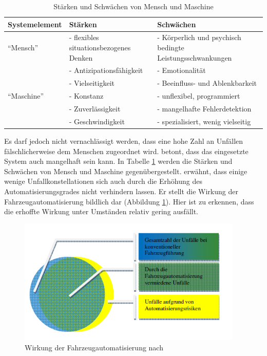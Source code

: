 \begin{table}[htpb]
	\scriptsize
	\caption[Stärken und Schwächen von Mensch und Maschine]{Stärken und Schwächen von Mensch und Maschine \parencite[S. 147]{Huguenin.2017} }\label{tab:Mensch vs. Maschine}
	\centering
	\begin{tabular}{l p{5cm} p{7cm}}
		\toprule
		Systemelement & Stärken & Schwächen \\
		\midrule
		\enquote{Mensch} & - flexibles situationsbezogenes Denken & - Körperlich und psychisch bedingte Leistungsschwankungen \\
		 & - Antizipationsfähigkeit & - Emotionalität \\
		 & - Vielseitigkeit & - Beeinfluss- und Ablenkbarkeit \\
		\midrule		 
		\enquote{Maschine} & - Konstanz & - unflexibel, programmiert \\
		 & - Zuverlässigkeit & - mangelhafte Fehlerdetektion \\
		 & - Geschwindigkeit & - spezialisiert, wenig vielseitig \\		 
		\bottomrule
	\end{tabular}
\end{table}

Es darf jedoch nicht vernachlässigt werden, dass eine hohe Zahl an Unfällen fälschlicherweise dem Menschen zugeordnet wird. \Textcite[S. 147]{Huguenin.2017} betont, dass das eingesetzte System auch mangelhaft sein kann. In Tabelle \ref{tab:Mensch vs. Maschine} werden die Stärken und Schwächen von Mensch und Maschine gegenübergestellt. \Textcite[S. 5]{Gasser.2011} erwähnt, dass einige wenige Unfallkonstellationen sich auch durch die Erhöhung des Automatisierungsgrades nicht verhindern lassen. Er stellt die Wirkung der Fahrzeugautomatisierung bildlich dar (Abbildung \ref{fig:Wirkung_Fahrzeugautomatisierung}). Hier ist zu erkennen, dass die erhoffte Wirkung unter Umständen relativ gering ausfällt.

\begin{savenotes}
	\begin{figure}[H]
		\centering
		\includegraphics[width=10.7cm,height=6cm]{figures/Wirkung_Fahrzeugautomatisierung}
		\caption[Wirkung der Fahrzeugautomatisierung]{Wirkung der Fahrzeugautomatisierung nach \Textcite[S. 5]{Gasser.2011}}\label{fig:Wirkung_Fahrzeugautomatisierung}
	\end{figure}
\end{savenotes}

